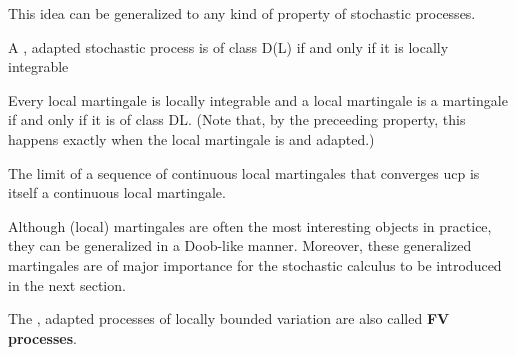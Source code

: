     This idea can be generalized to any kind of property of stochastic processes.

    \begin{property}
        A \cdlgg, adapted stochastic process is of class D(L) if and only if it is locally integrable
    \end{property}
    \begin{property}
        Every local martingale is locally integrable and a local martingale is a martingale if and only if it is of class DL. (Note that, by the preceeding property, this happens exactly when the local martingale is \cdlg and adapted.)
    \end{property}

    \begin{property}[Convergence]
        The limit of a sequence of continuous local martingales that converges ucp is itself a  continuous local martingale.
    \end{property}

    Although (local) martingales are often the most interesting objects in practice, they can be generalized in a Doob-like manner. Moreover, these generalized martingales are of major importance for the stochastic calculus to be introduced in the next section.
    \begin{remark}
        The \cdlgg, adapted processes of locally bounded variation are also called \textbf{FV processes}.
    \end{remark}

